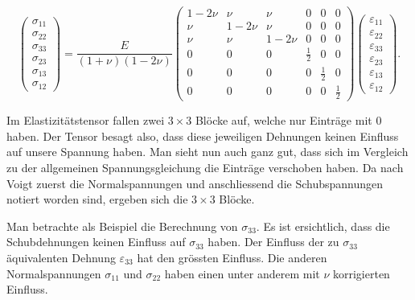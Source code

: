 \begin{equation}
\begin{pmatrix}
	\sigma_{11}\\
	\sigma_{22}\\
	\sigma_{33}\\
	\sigma_{23}\\
	\sigma_{13}\\
	\sigma_{12}
\end{pmatrix}
=
\frac{E}{(1+\nu)(1-2\nu)}
\begin{pmatrix}
	1- 2\nu & \nu     & \nu     & 0           & 0           & 0\\
	    \nu & 1- 2\nu & \nu     & 0           & 0           & 0\\
        \nu & \nu     & 1- 2\nu & 0           & 0           & 0\\
          0 & 0       & 0       & \frac{1}{2} & 0           & 0\\
          0 & 0       & 0       & 0           & \frac{1}{2} & 0\\
          0 & 0       & 0       & 0           & 0           & \frac{1}{2}
\end{pmatrix}
\begin{pmatrix}
	\varepsilon_{11}\\
	\varepsilon_{22}\\
	\varepsilon_{33}\\
	\varepsilon_{23}\\
	\varepsilon_{13}\\
	\varepsilon_{12}
\end{pmatrix}
.
\label{spannung:Spannungsgleichung}
\end{equation}

Im Elastizitätstensor fallen zwei $3\times3$ Blöcke auf, welche nur Einträge mit $0$ haben. Der Tensor besagt also,
dass diese jeweiligen Dehnungen keinen Einfluss auf unsere Spannung haben.
Man sieht nun auch ganz gut, dass sich im Vergleich zu der allgemeinen Spannungsgleichung die Einträge verschoben haben.
Da nach Voigt zuerst die Normalspannungen und anschliessend die Schubspannungen notiert worden sind, ergeben sich die  $3\times3$ Blöcke.

Man betrachte als Beispiel die Berechnung von $\sigma_{33}$.
Es ist ersichtlich, dass die Schubdehnungen keinen Einfluss auf $\sigma_{33}$ haben.
Der Einfluss der zu $\sigma_{33}$ äquivalenten Dehnung $\varepsilon_{33}$ hat den grössten Einfluss.
Die anderen Normalspannungen $\sigma_{11}$ und $\sigma_{22}$ haben einen unter anderem mit $\nu$ korrigierten Einfluss.

